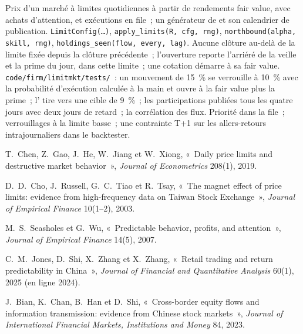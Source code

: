 \begin{build}
 Prix d'un marché à limites quotidiennes à partir de rendements fair value, avec achats d'attention,  et exécutions en file~; un générateur de  et
son calendrier de publication.
 \texttt{LimitConfig(\dots)}, \texttt{apply\_limits(R, cfg, rng)}, \texttt{northbound(alpha, skill, rng)},
\texttt{holdings\_seen(flow, every, lag)}.
 Aucune clôture au-delà de la limite fixée depuis la clôture précédente~; l'ouverture reporte l'arriéré de la veille et la prime du jour, dans cette limite~; une cotation
démarre à sa fair value.
 \texttt{code/firm/limitmkt/tests/}~: un mouvement de 15~\% se verrouille à 10~\% avec la probabilité d'exécution calculée à la main et ouvre à la fair value
plus la prime~; l' tire vers une cible de 9~\%~; les participations publiées tous les quatre jours avec deux jours de retard~; la corrélation des flux.
 Priorité dans la file~; verrouillages à la limite basse~; une contrainte T+1 sur les allers-retours intrajournaliers dans le backtester.
\end{build}

\begin{omsources}
\item T.~Chen, Z.~Gao, J.~He, W.~Jiang et W.~Xiong, «~Daily price limits and destructive market behavior~», \emph{Journal of Econometrics} 208(1),
2019.
\item D.~D.~Cho, J.~Russell, G.~C.~Tiao et R.~Tsay, «~The magnet effect of price limits: evidence from high-frequency data on Taiwan Stock Exchange~»,
\emph{Journal of Empirical Finance} 10(1--2), 2003.
\item M.~S.~Seasholes et G.~Wu, «~Predictable behavior, profits, and attention~», \emph{Journal of Empirical Finance} 14(5), 2007.
\item C.~M.~Jones, D.~Shi, X.~Zhang et X.~Zhang, «~Retail trading and return predictability in China~», \emph{Journal of Financial and Quantitative
Analysis} 60(1), 2025 (en ligne 2024).
\item J.~Bian, K.~Chan, B.~Han et D.~Shi, «~Cross-border equity flows and information transmission: evidence from Chinese stock markets~»,
\emph{Journal of International Financial Markets, Institutions and Money} 84, 2023.
\end{omsources}

